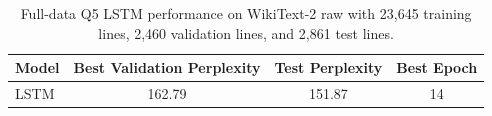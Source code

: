 \begin{table}[H]
\centering
\small
\begin{tabular}{lccc}
\toprule
Model & Best Validation Perplexity & Test Perplexity & Best Epoch \\
\midrule
LSTM & 162.79 & 151.87 & 14 \\
\bottomrule
\end{tabular}
\caption{Full-data Q5 LSTM performance on WikiText-2 raw with 23{,}645 training lines, 2{,}460 validation lines, and 2{,}861 test lines.}
\label{tab:q5_overall_results}
\end{table}